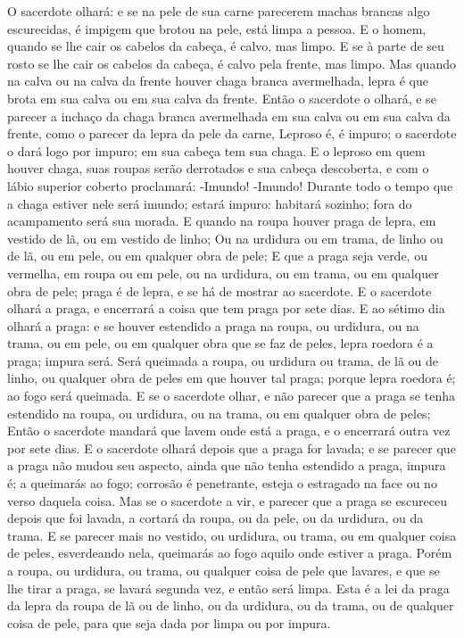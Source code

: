 {O sacerdote olhará: e se na pele de sua carne parecerem machas brancas algo escurecidas, é impigem que brotou na pele, está limpa a pessoa.
E o homem, quando se lhe cair os cabelos da cabeça, é calvo, mas limpo.
E se à parte de seu rosto se lhe cair os cabelos da cabeça, é calvo pela frente, mas limpo.
Mas quando na calva ou na calva da frente houver chaga branca avermelhada, lepra é que brota em sua calva ou em sua calva da frente.
Então o sacerdote o olhará, e se parecer a inchaço da chaga branca avermelhada em sua calva ou em sua calva da frente, como o parecer da lepra da pele da carne,
Leproso é, é impuro; o sacerdote o dará logo por impuro; em sua cabeça tem sua chaga.
E o leproso em quem houver chaga, suas roupas serão derrotados e sua cabeça descoberta, e com o lábio superior coberto proclamará: -Imundo! -Imundo!
Durante todo o tempo que a chaga estiver nele será imundo; estará impuro: habitará sozinho; fora do acampamento será sua morada.
E quando na roupa houver praga de lepra, em vestido de lã, ou em vestido de linho;
Ou na urdidura ou em trama, de linho ou de lã, ou em pele, ou em qualquer obra de pele;
E que a praga seja verde, ou vermelha, em roupa ou em pele, ou na urdidura, ou em trama, ou em qualquer obra de pele; praga é de lepra, e se há de mostrar ao sacerdote.
E o sacerdote olhará a praga, e encerrará a coisa que tem praga por sete dias.
E ao sétimo dia olhará a praga: e se houver estendido a praga na roupa, ou urdidura, ou na trama, ou em pele, ou em qualquer obra que se faz de peles, lepra roedora é a praga; impura será.
Será queimada a roupa, ou urdidura ou trama, de lã ou de linho, ou qualquer obra de peles em que houver tal praga; porque lepra roedora é; ao fogo será queimada.
E se o sacerdote olhar, e não parecer que a praga se tenha estendido na roupa, ou urdidura, ou na trama, ou em qualquer obra de peles;
Então o sacerdote mandará que lavem onde está a praga, e o encerrará outra vez por sete dias.
E o sacerdote olhará depois que a praga for lavada; e se parecer que a praga não mudou seu aspecto, ainda que não tenha estendido a praga, impura é; a queimarás ao fogo; corrosão é penetrante, esteja o estragado na face ou no verso daquela coisa.
Mas se o sacerdote a vir, e parecer que a praga se escureceu depois que foi lavada, a cortará da roupa, ou da pele, ou da urdidura, ou da trama.
E se parecer mais no vestido, ou urdidura, ou trama, ou em qualquer coisa de peles, esverdeando nela, queimarás ao fogo aquilo onde estiver a praga.
Porém a roupa, ou urdidura, ou trama, ou qualquer coisa de pele que lavares, e que se lhe tirar a praga, se lavará segunda vez, e então será limpa.
Esta é a lei da praga da lepra da roupa de lã ou de linho, ou da urdidura, ou da trama, ou de qualquer coisa de pele, para que seja dada por limpa ou por impura.

}
